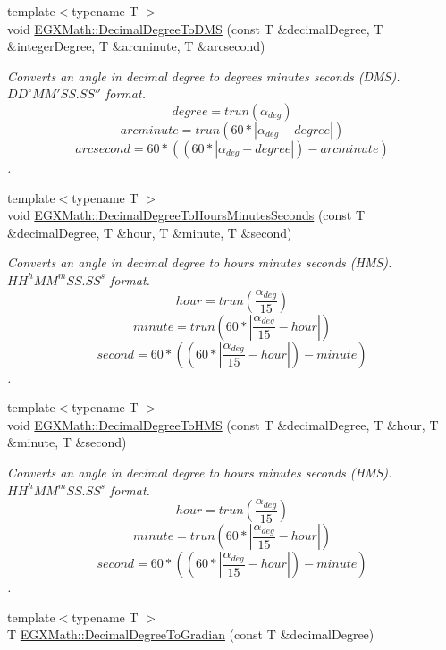\begin{DoxyCompactItemize}
{\footnotesize template$<$typename T $>$ }\\void \mbox{\hyperlink{group___e_g_x_math-_conversions-_angle_conversions-_decimal_degree_ga64a1b298ce16e9edf3209b678a7bed46}{E\+G\+X\+Math\+::\+Decimal\+Degree\+To\+D\+MS}} (const T \&decimal\+Degree, T \&integer\+Degree, T \&arcminute, T \&arcsecond)
\begin{DoxyCompactList}\small\item\em Converts an angle in decimal degree to degrees minutes seconds (D\+MS). ${DD}^{\circ}{MM}'{SS.SS}''$ format. \[degree=trun(\alpha_{deg})\] \[arcminute=trun(60 * |\alpha_{deg} - degree|)\] \[arcsecond=60 * ((60 * |\alpha_{deg} - degree|)-arcminute)\]. \end{DoxyCompactList}\item 
{\footnotesize template$<$typename T $>$ }\\void \mbox{\hyperlink{group___e_g_x_math-_conversions-_angle_conversions-_decimal_degree_gaa3f0b6c7c497882935487ad2d55a0f5a}{E\+G\+X\+Math\+::\+Decimal\+Degree\+To\+Hours\+Minutes\+Seconds}} (const T \&decimal\+Degree, T \&hour, T \&minute, T \&second)
\begin{DoxyCompactList}\small\item\em Converts an angle in decimal degree to hours minutes seconds (H\+MS). ${HH}^{h}{MM}^{m}{SS.SS}^{s}$ format. \[hour=trun(\frac{\alpha_{deg}}{15})\] \[minute=trun(60 * |\frac{\alpha_{deg}}{15} - hour|)\] \[second=60 * ((60 * |\frac{\alpha_{deg}}{15} - hour|)-minute)\]. \end{DoxyCompactList}\item 
{\footnotesize template$<$typename T $>$ }\\void \mbox{\hyperlink{group___e_g_x_math-_conversions-_angle_conversions-_decimal_degree_ga981b48f16766590641360ca98dfa7b8c}{E\+G\+X\+Math\+::\+Decimal\+Degree\+To\+H\+MS}} (const T \&decimal\+Degree, T \&hour, T \&minute, T \&second)
\begin{DoxyCompactList}\small\item\em Converts an angle in decimal degree to hours minutes seconds (H\+MS). ${HH}^{h}{MM}^{m}{SS.SS}^{s}$ format. \[hour=trun(\frac{\alpha_{deg}}{15})\] \[minute=trun(60 * |\frac{\alpha_{deg}}{15} - hour|)\] \[second=60 * ((60 * |\frac{\alpha_{deg}}{15} - hour|)-minute)\]. \end{DoxyCompactList}\item 
{\footnotesize template$<$typename T $>$ }\\T \mbox{\hyperlink{group___e_g_x_math-_conversions-_angle_conversions-_decimal_degree_ga3ac6f1ceb36a4938cdf3b55554734c99}{E\+G\+X\+Math\+::\+Decimal\+Degree\+To\+Gradian}} (const T \&decimal\+Degree)

\end{DoxyCompactItemize}
